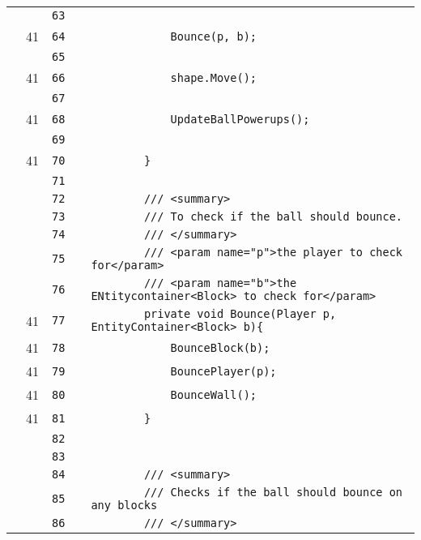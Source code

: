 \documentclass[a4paper,landscape,10pt]{article}
\begin{document}
\begin{longtable}[l]{lrrll}
\cellcolor{gray} &  & \verb~63~ & & \verb~~\\
\cellcolor{green} & 41 & \verb~64~ & & \verb~            Bounce(p, b);~\\
\cellcolor{gray} &  & \verb~65~ & & \verb~~\\
\cellcolor{green} & 41 & \verb~66~ & & \verb~            shape.Move();~\\
\cellcolor{gray} &  & \verb~67~ & & \verb~~\\
\cellcolor{green} & 41 & \verb~68~ & & \verb~            UpdateBallPowerups();~\\
\cellcolor{gray} &  & \verb~69~ & & \verb~~\\
\cellcolor{green} & 41 & \verb~70~ & & \verb~        }~\\
\cellcolor{gray} &  & \verb~71~ & & \verb~~\\
\cellcolor{gray} &  & \verb~72~ & & \verb~        /// <summary>~\\
\cellcolor{gray} &  & \verb~73~ & & \verb~        /// To check if the ball should bounce.~\\
\cellcolor{gray} &  & \verb~74~ & & \verb~        /// </summary>~\\
\cellcolor{gray} &  & \verb~75~ & & \verb~        /// <param name="p">the player to check for</param>~\\
\cellcolor{gray} &  & \verb~76~ & & \verb~        /// <param name="b">the ENtitycontainer<Block> to check for</param>~\\
\cellcolor{green} & 41 & \verb~77~ & & \verb~        private void Bounce(Player p, EntityContainer<Block> b){~\\
\cellcolor{green} & 41 & \verb~78~ & & \verb~            BounceBlock(b);~\\
\cellcolor{green} & 41 & \verb~79~ & & \verb~            BouncePlayer(p);~\\
\cellcolor{green} & 41 & \verb~80~ & & \verb~            BounceWall();~\\
\cellcolor{green} & 41 & \verb~81~ & & \verb~        }~\\
\cellcolor{gray} &  & \verb~82~ & & \verb~~\\
\cellcolor{gray} &  & \verb~83~ & & \verb~~\\
\cellcolor{gray} &  & \verb~84~ & & \verb~        /// <summary>~\\
\cellcolor{gray} &  & \verb~85~ & & \verb~        /// Checks if the ball should bounce on any blocks~\\
\cellcolor{gray} &  & \verb~86~ & & \verb~        /// </summary>~\\

\end{longtable}
\end{document}
